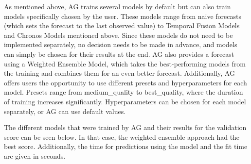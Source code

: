 \documentclass[a4paper]{article}
\begin{document}
As mentioned above, AG trains several models by default but can also
train models specifically chosen by the user. These models range from
naive forecasts (which sets the forecast to the last observed value) to
Temporal Fusion Models and Chronos Models mentioned above. Since these
models do not need to be implemented separately, no decision needs to be
made in advance, and models can simply be chosen for their results at
the end. AG also provides a forecast using a Weighted Ensemble Model,
which takes the best-performing models from the training and combines
them for an even better forecast. Additionally, AG offers users the
opportunity to use different presets and hyperparameters for each model.
Presets range from medium\_quality to best\_quality, where the duration
of training increases significantly. Hyperparameters can be chosen for
each model separately, or AG can use default values.

The different models that were trained by AG and their results for the
validation score can be seen below. In that case, the weighted ensemble
approach had the best score. Additionally, the time for predictions
using the model and the fit time are given in seconds.
\end{document}
